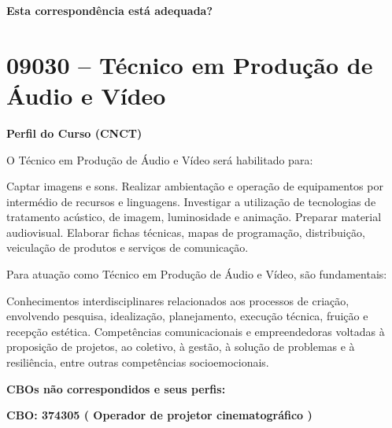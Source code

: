 \documentclass[
]{article}
\begin{document}
\begin{Form}
\textbf{Esta correspondência está adequada?} \\ 
\end{Form}

\newpage
\section{ 09030 -- Técnico em Produção de Áudio e Vídeo }

\textbf{Perfil do Curso (CNCT)}

O Técnico em Produção de Áudio e Vídeo será habilitado para:

Captar imagens e sons. Realizar ambientação e operação de equipamentos
por intermédio de recursos e linguagens. Investigar a utilização de
tecnologias de tratamento acústico, de imagem, luminosidade e animação.
Preparar material audiovisual. Elaborar fichas técnicas, mapas de
programação, distribuição, veiculação de produtos e serviços de
comunicação.

Para atuação como Técnico em Produção de Áudio e Vídeo, são
fundamentais:

Conhecimentos interdisciplinares relacionados aos processos de criação,
envolvendo pesquisa, idealização, planejamento, execução técnica,
fruição e recepção estética. Competências comunicacionais e
empreendedoras voltadas à proposição de projetos, ao coletivo, à gestão,
à solução de problemas e à resiliência, entre outras competências
socioemocionais.

\textbf{CBOs não correspondidos e seus perfis:}

\textbf{CBO: 374305  ( Operador de projetor cinematográfico )}
\end{document}
